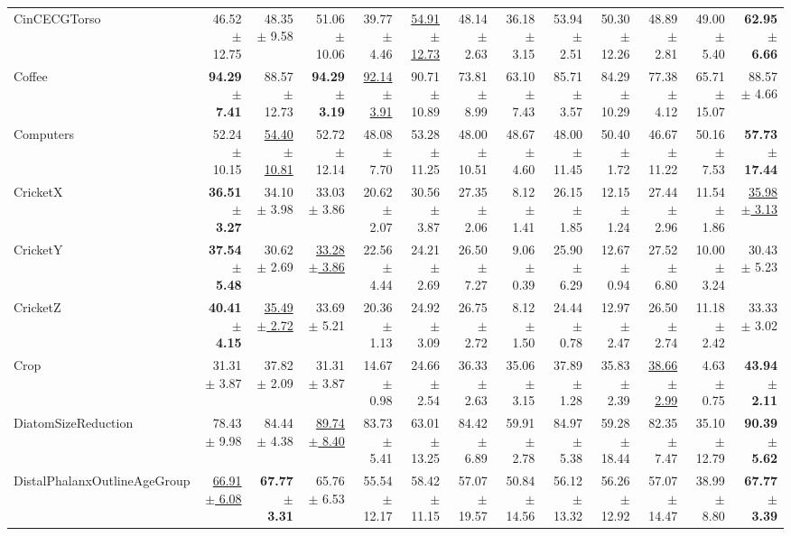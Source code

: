\begin{landscape}
\begin{longtable}{lrrrrrrrrrrrr}
CinCECGTorso & 46.52 $\pm$ 12.75 & 48.35 $\pm$ 9.58 & 51.06 $\pm$ 10.06 & 39.77 $\pm$ 4.46 & \underline{54.91 $\pm$ 12.73} & 48.14 $\pm$ 2.63 & 36.18 $\pm$ 3.15 & 53.94 $\pm$ 2.51 & 50.30 $\pm$ 12.26 & 48.89 $\pm$ 2.81 & 49.00 $\pm$ 5.40 & \textbf{62.95 $\pm$ 6.66} \\
Coffee & \textbf{94.29 $\pm$ 7.41} & 88.57 $\pm$ 12.73 & \textbf{94.29 $\pm$ 3.19} & \underline{92.14 $\pm$ 3.91} & 90.71 $\pm$ 10.89 & 73.81 $\pm$ 8.99 & 63.10 $\pm$ 7.43 & 85.71 $\pm$ 3.57 & 84.29 $\pm$ 10.29 & 77.38 $\pm$ 4.12 & 65.71 $\pm$ 15.07 & 88.57 $\pm$ 4.66 \\
Computers & 52.24 $\pm$ 10.15 & \underline{54.40 $\pm$ 10.81} & 52.72 $\pm$ 12.14 & 48.08 $\pm$ 7.70 & 53.28 $\pm$ 11.25 & 48.00 $\pm$ 10.51 & 48.67 $\pm$ 4.60 & 48.00 $\pm$ 11.45 & 50.40 $\pm$ 1.72 & 46.67 $\pm$ 11.22 & 50.16 $\pm$ 7.53 & \textbf{57.73 $\pm$ 17.44} \\
CricketX & \textbf{36.51 $\pm$ 3.27} & 34.10 $\pm$ 3.98 & 33.03 $\pm$ 3.86 & 20.62 $\pm$ 2.07 & 30.56 $\pm$ 3.87 & 27.35 $\pm$ 2.06 & 8.12 $\pm$ 1.41 & 26.15 $\pm$ 1.85 & 12.15 $\pm$ 1.24 & 27.44 $\pm$ 2.96 & 11.54 $\pm$ 1.86 & \underline{35.98 $\pm$ 3.13} \\
CricketY & \textbf{37.54 $\pm$ 5.48} & 30.62 $\pm$ 2.69 & \underline{33.28 $\pm$ 3.86} & 22.56 $\pm$ 4.44 & 24.21 $\pm$ 2.69 & 26.50 $\pm$ 7.27 & 9.06 $\pm$ 0.39 & 25.90 $\pm$ 6.29 & 12.67 $\pm$ 0.94 & 27.52 $\pm$ 6.80 & 10.00 $\pm$ 3.24 & 30.43 $\pm$ 5.23 \\
CricketZ & \textbf{40.41 $\pm$ 4.15} & \underline{35.49 $\pm$ 2.72} & 33.69 $\pm$ 5.21 & 20.36 $\pm$ 1.13 & 24.92 $\pm$ 3.09 & 26.75 $\pm$ 2.72 & 8.12 $\pm$ 1.50 & 24.44 $\pm$ 0.78 & 12.97 $\pm$ 2.47 & 26.50 $\pm$ 2.74 & 11.18 $\pm$ 2.42 & 33.33 $\pm$ 3.02 \\
Crop & 31.31 $\pm$ 3.87 & 37.82 $\pm$ 2.09 & 31.31 $\pm$ 3.87 & 14.67 $\pm$ 0.98 & 24.66 $\pm$ 2.54 & 36.33 $\pm$ 2.63 & 35.06 $\pm$ 3.15 & 37.89 $\pm$ 1.28 & 35.83 $\pm$ 2.39 & \underline{38.66 $\pm$ 2.99} & 4.63 $\pm$ 0.75 & \textbf{43.94 $\pm$ 2.11} \\
DiatomSizeReduction & 78.43 $\pm$ 9.98 & 84.44 $\pm$ 4.38 & \underline{89.74 $\pm$ 8.40} & 83.73 $\pm$ 5.41 & 63.01 $\pm$ 13.25 & 84.42 $\pm$ 6.89 & 59.91 $\pm$ 2.78 & 84.97 $\pm$ 5.38 & 59.28 $\pm$ 18.44 & 82.35 $\pm$ 7.47 & 35.10 $\pm$ 12.79 & \textbf{90.39 $\pm$ 5.62} \\
DistalPhalanxOutlineAgeGroup & \underline{66.91 $\pm$ 6.08} & \textbf{67.77 $\pm$ 3.31} & 65.76 $\pm$ 6.53 & 55.54 $\pm$ 12.17 & 58.42 $\pm$ 11.15 & 57.07 $\pm$ 19.57 & 50.84 $\pm$ 14.56 & 56.12 $\pm$ 13.32 & 56.26 $\pm$ 12.92 & 57.07 $\pm$ 14.47 & 38.99 $\pm$ 8.80 & \textbf{67.77 $\pm$ 3.39} \\

\end{longtable}
\end{landscape}
